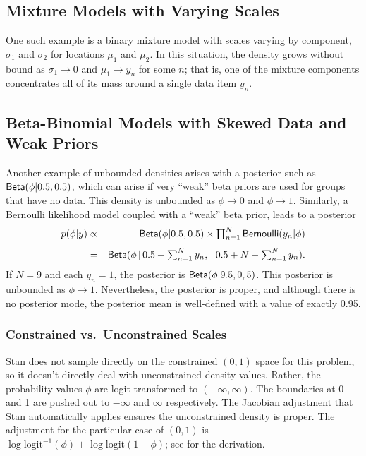 \subsection{Mixture Models with Varying Scales}

One such example is a binary mixture model with scales varying by
component, $\sigma_1$ and $\sigma_2$ for locations $\mu_1$ and
$\mu_2$. In this situation, the density grows without bound as
$\sigma_1 \rightarrow 0$ and $\mu_1 \rightarrow y_n$ for some $n$;
that is, one of the mixture components concentrates all of its mass
around a single data item $y_n$.

\subsection{Beta-Binomial Models with Skewed Data and Weak Priors}

Another example of unbounded densities arises with a posterior such as
$\distro{Beta}(\phi|0.5,0.5)$, which can arise if very ``weak'' beta
priors are used for groups that have no data. This density is
unbounded as $\phi \rightarrow 0$ and $\phi \rightarrow 1$. Similarly,
a Bernoulli likelihood model coupled with a ``weak'' beta prior, leads
to a posterior
%
\begin{eqnarray*}
p(\phi|y) 
& \propto & \textstyle
\distro{Beta}(\phi|0.5,0.5) \times \prod_{n=1}^N \distro{Bernoulli}(y_n|\phi)
\\[4pt]
& = &\textstyle
\distro{Beta}(\phi \, | \, 0.5 + \sum_{n=1}^N y_n, \ \ 0.5 + N - \sum_{n=1}^N y_n).
\end{eqnarray*}
%
If $N = 9$ and each $y_n = 1$, the posterior is
$\distro{Beta}(\phi|9.5,0,5)$.  This posterior is unbounded as $\phi
\rightarrow 1$.  Nevertheless, the posterior is proper, and although
there is no posterior mode, the posterior mean is well-defined with a
value of exactly 0.95.

\subsubsection{Constrained vs.\ Unconstrained Scales}

Stan does not sample directly on the constrained $(0,1)$ space for
this problem, so it doesn't directly deal with unconstrained density
values.  Rather, the probability values $\phi$ are logit-transformed
to $(-\infty,\infty)$.  The boundaries at 0 and 1 are pushed out to
$-\infty$ and $\infty$ respectively.  The Jacobian adjustment that
Stan automatically applies ensures the unconstrained density is
proper.  The adjustment for the particular case of $(0,1)$ is $\log
\mbox{logit}^{-1}(\phi) + \log \mbox{logit}(1 - \phi)$; see
 for the derivation.

